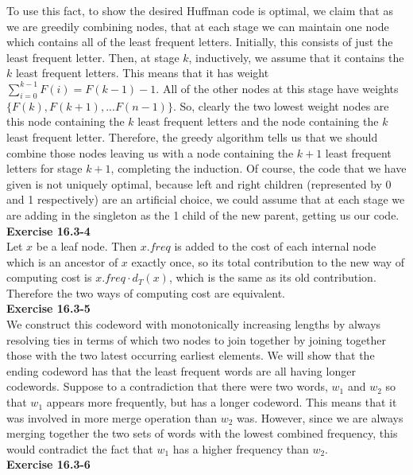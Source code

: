 \documentclass{article}
\begin{document}
To use this fact, to show the desired Huffman code is optimal, we claim that as we are greedily combining nodes, that at each stage we can maintain one node which contains all of the least frequent letters. Initially, this consists of just the least frequent letter. Then, at stage $k$, inductively, we assume that it contains the $k$ least frequent letters. This means that it has weight $\sum_{i=0}^{k-1} F(i) = F(k-1)-1$. All of the other nodes at this stage have weights $\{F(k), F(k+1), ... F(n-1)\}$. So, clearly the two lowest weight nodes are this node containing the $k$ least frequent letters and the node containing the $k$ least frequent letter. Therefore, the greedy algorithm tells us that we should combine those nodes leaving us with a node containing the $k+1$ least frequent letters for stage $k+1$, completing the induction. Of course, the code that we have given is not uniquely optimal, because left and right children (represented by 0 and 1 respectively) are an artificial choice, we could assume that at each stage we are adding in the singleton as the 1 child of the new parent, getting us our code.\\

\noindent\textbf{Exercise 16.3-4}\\

Let $x$ be a leaf node.  Then $x.freq$ is added to the cost of each internal node which is an ancestor of $x$ exactly once, so its total contribution to the new way of computing cost is $x.freq\cdot d_T(x)$, which is the same as its old contribution.  Therefore the two ways of computing cost are equivalent. \\

\noindent\textbf{Exercise 16.3-5}\\
We construct this codeword with monotonically increasing lengths by always resolving ties in terms of which two nodes to join together by joining together those with the two latest occurring earliest elements. We will show that the ending codeword has that the least frequent words are all having longer codewords. Suppose to a contradiction that there were two words, $w_1$ and $w_2$ so that $w_1$ appears more frequently, but has a longer codeword. This means that it was involved in more merge operation than $w_2$ was. However, since we are always merging together the two sets of words with the lowest combined frequency, this would contradict the fact that $w_1$ has a higher frequency than $w_2$.\\

\noindent\textbf{Exercise 16.3-6}\\
\end{document}
